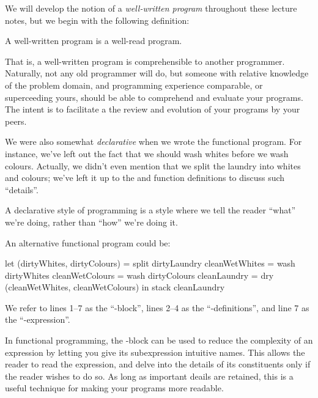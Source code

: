 We will develop the notion of a \emph{well-written program} throughout these
lecture notes, but we begin with the following definition:

\begin{definition}

A well-written program is a well-read program.

\end{definition}

That is, a well-written program is comprehensible to another programmer.
Naturally, not any old programmer will do, but someone with relative knowledge
of the problem domain, and programming experience comparable, or superceeding
yours, should be able to comprehend and evaluate your programs. The intent is
to facilitate a the review and evolution of your programs by your peers.

We were also somewhat \emph{declarative} when we wrote the functional program.
For instance, we've left out the fact that we should wash whites before we wash
colours. Actually, we didn't even mention that we split the laundry into whites
and colours; we've left it up to the  and  function
definitions to discuss such ``details''.

\begin{definition}

A declarative style of programming is a style where we tell the reader ``what''
we're doing, rather than ``how'' we're doing it.

\end{definition}

An alternative functional program could be:

\begin{code}
let
  (dirtyWhites, dirtyColours) = split dirtyLaundry
  cleanWetWhites = wash dirtyWhites
  cleanWetColours = wash dirtyColours
  cleanLaundry = dry (cleanWetWhites, cleanWetColours)
in
  stack cleanLaundry
\end{code}

We refer to lines 1--7 as the ``-block'', lines 2--4 as the
``-definitions'', and line 7 as the ``-expression''.

In functional programming, the -block can be used to reduce the
complexity of an expression by letting you give its subexpression intuitive
names. This allows the reader to read the expression, and delve into the
details of its constituents only if the reader wishes to do so. As long as
important deails are retained, this is a useful technique for making your
programs more readable.

